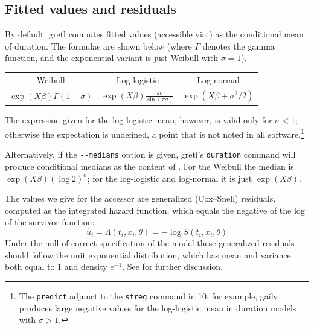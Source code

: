 \subsection{Fitted values and residuals}

By default, gretl computes fitted values (accessible via
) as the conditional mean of duration.  The formulae
are shown below (where $\Gamma$ denotes the gamma function, and the
exponential variant is just Weibull with $\sigma = 1$).

\begin{center}
\setlength\tabcolsep{1em}
\begin{tabular}{ccc}
Weibull & Log-logistic & Log-normal \\ [4pt]
$\exp(X\beta)\Gamma(1 + \sigma)$ &
$\displaystyle \exp(X\beta)\frac{\pi \sigma}{\sin(\pi \sigma)}$ &
$\exp(X\beta + \sigma^2/2)$
\end{tabular}
\end{center}

The expression given for the log-logistic mean, however, is valid only
for $\sigma < 1$; otherwise the expectation is undefined, a point that
is not noted in all software.\footnote{The \texttt{predict} adjunct to
  the \texttt{streg} command in  10, for example, gaily
  produces large negative values for the log-logistic mean in duration
  models with $\sigma > 1$.}

Alternatively, if the \verb|--medians| option is given, gretl's
\texttt{duration} command will produce conditional medians as the
content of .  For the Weibull the median is
$\exp(X\beta)(\log 2)^\sigma$; for the log-logistic and log-normal it
is just $\exp(X\beta)$.

The values we give for the accessor  are generalized
(Cox--Snell) residuals, computed as the integrated hazard function,
which equals the negative of the log of the survivor function:
\[
\hat{u}_i = \Lambda(t_i, x_i, \theta) = -\log S(t_i, x_i, \theta)
\]
Under the null of correct specification of the model these generalized
residuals should follow the unit exponential distribution, which has
mean and variance both equal to 1 and density $e^{-1}$. See
\cite{cameron-trivedi05} for further discussion.


